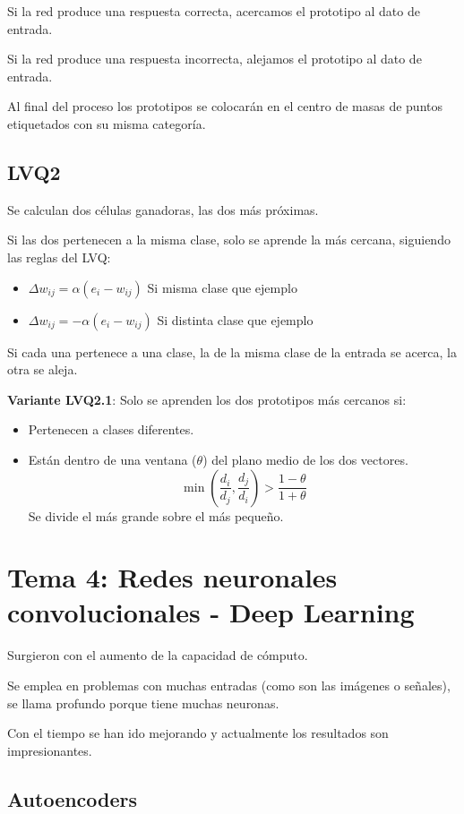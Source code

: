 \documentclass[12pt, twoside, openright]{report} %
\begin{document}
Si la red produce una respuesta correcta, acercamos el prototipo al dato de entrada.

Si la red produce una respuesta incorrecta, alejamos el prototipo al dato de entrada.

Al final del proceso los prototipos se colocarán en el centro de masas de puntos etiquetados con su misma categoría.
\pagebreak

\section{LVQ2}
Se calculan dos células ganadoras, las dos más próximas.

Si las dos pertenecen a la misma clase, solo se aprende la más cercana, siguiendo las reglas del LVQ:
\begin{itemize}
	\item $\Delta w_{ij} = \alpha (e_i - w_{ij})$ Si misma clase que ejemplo
	\item $\Delta w_{ij} = - \alpha (e_i - w_{ij})$ Si distinta clase que ejemplo
\end{itemize}

Si cada una pertenece a una clase, la de la misma clase de la entrada se acerca, la otra se aleja.

\textbf{Variante LVQ2.1}: Solo se aprenden los dos prototipos más cercanos si:
\begin{itemize}
	\item Pertenecen a clases diferentes.
	\item Están dentro de una ventana ($\theta$) del plano medio de los dos vectores.
	$$\min \left(\frac{d_i}{d_j}, \frac{d_j}{d_i} \right) > \frac{1-\theta}{1+\theta}$$
	Se divide el más grande sobre el más pequeño.
\end{itemize}

\chapter{Tema 4: Redes neuronales convolucionales - Deep Learning}
Surgieron con el aumento de la capacidad de cómputo.

Se emplea en problemas con muchas entradas (como son las imágenes o señales), se llama profundo porque tiene muchas neuronas.

Con el tiempo se han ido mejorando y actualmente los resultados son impresionantes.

\section{Autoencoders}
\end{document}
